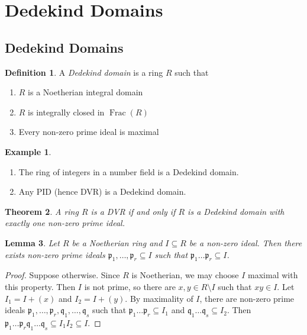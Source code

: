 \documentclass[11pt]{article}
\theoremstyle{definition}
\newtheorem{definition}{Definition}[subsection]
\newtheorem*{example}{Example}
\theoremstyle{plain}
\newtheorem{theorem}[definition]{Theorem}
\newtheorem{lemma}[definition]{Lemma}
\theoremstyle{remark}
\DeclareMathOperator{\Frac}{Frac}
\newcommand{\fp}{\mathfrak{p}}
\newcommand{\fq}{\mathfrak{q}}
\begin{document}
\section{Dedekind Domains}

\subsection{Dedekind Domains}

\begin{definition}
    A \emph{Dedekind domain} is a ring $R$ such that
    \begin{enumerate}
        \item $R$ is a Noetherian integral domain
        \item $R$ is integrally closed in $\Frac(R)$
        \item Every non-zero prime ideal is maximal
    \end{enumerate}
\end{definition}

\begin{example}\phantom{}
    \begin{enumerate}
        \item The ring of integers in a number field is a Dedekind domain.
        \item Any PID (hence DVR) is a Dedekind domain.
    \end{enumerate}
\end{example}

\begin{theorem}\label{thm:9_2}
    A ring $R$ is a DVR if and only if $R$ is a Dedekind domain with exactly one non-zero prime ideal.
\end{theorem}

\begin{lemma}\label{lem:9_3}
    Let $R$ be a Noetherian ring and $I \subseteq R$ be a non-zero ideal. Then there exists non-zero prime ideals $\fp_1, \ldots, \fp_r \subseteq I$ such that $\fp_1 \ldots \fp_r \subseteq I$.
\end{lemma}
\begin{proof}
    Suppose otherwise. Since $R$ is Noetherian, we may choose $I$ maximal with this property. Then $I$ is not prime, so there are $x, y \in R \setminus I$ such that $xy \in I$. Let $I_1 = I + (x)$ and $I_2 = I + (y)$. By maximality of $I$, there are non-zero prime ideals $\fp_1, \ldots, \fp_r, \fq_1, \ldots, \fq_s$ such that $\fp_1 \ldots \fp_r \subseteq I_1$ and $\fq_1 \ldots \fq_s \subseteq I_2$. Then $\fp_1 \ldots \fp_r \fq_1 \ldots \fq_s \subseteq I_1 I_2 \subseteq I$.
\end{proof}
\end{document}
